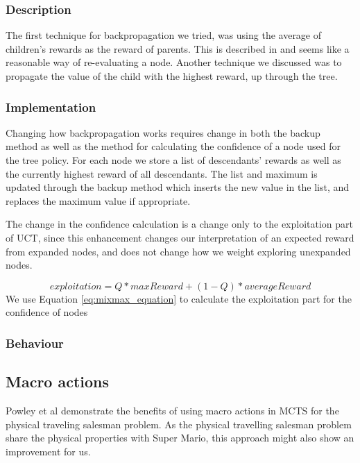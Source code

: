 \documentclass[10pt,a4paper]{article}
\begin{document}
\subsubsection{Description}
The first technique for backpropagation we tried, was using the average of children's rewards as the reward of parents. This is described in %
and seems like a reasonable way of re-evaluating a node.
Another technique we discussed was to propagate the value of the child with the highest reward, up through the tree. %


\subsubsection{Implementation}
Changing how backpropagation works requires change in both the backup method as well as the method for calculating the confidence of a node used for the tree policy.
For each node we store a list of descendants' rewards as well as the currently highest reward of all descendants. The list and maximum is updated through the backup method which inserts the new value in the list, and replaces the maximum value if appropriate.

The change in the confidence calculation is a change only to the exploitation part of UCT, since this enhancement changes our interpretation of an expected reward from expanded nodes, and does not change how we weight exploring unexpanded nodes.

\begin{equation}\label{eq:mixmax_equation}
exploitation = Q * maxReward + (1 - Q ) * averageReward
\end{equation}
We use Equation \ref{eq:mixmax_equation} to calculate the exploitation part for the confidence of nodes

\subsubsection{Behaviour}

\subsection{Macro actions}
\label{macro}
Powley et al demonstrate the benefits of using macro actions in MCTS for the physical traveling salesman problem\cite{salesman}. As the physical travelling salesman problem share the physical properties with Super Mario, this approach might also show an improvement for us.
\end{document}
